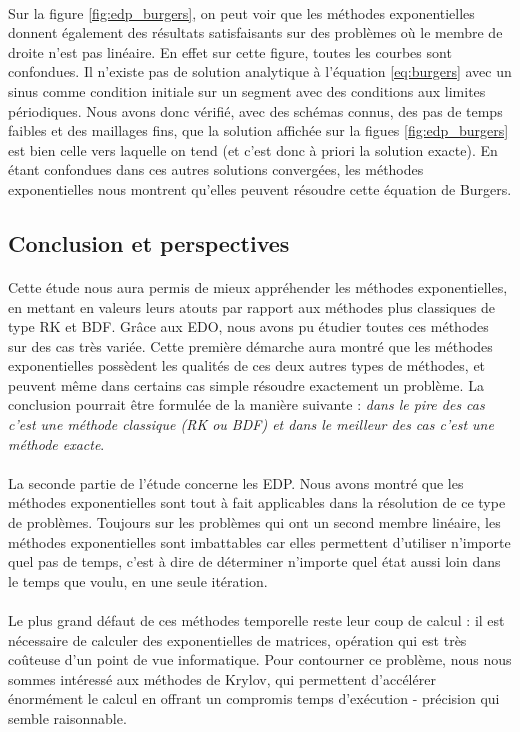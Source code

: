     \paragraph{}
    Sur la figure \ref{fig:edp_burgers}, on peut voir que les méthodes exponentielles donnent également des résultats satisfaisants sur des problèmes où le membre de droite n'est pas linéaire. En effet sur cette figure, toutes les courbes sont confondues. Il n'existe pas de solution analytique à l'équation \ref{eq:burgers} avec un sinus comme condition initiale sur un segment avec des conditions aux limites périodiques. Nous avons donc vérifié, avec des schémas connus, des pas de temps faibles et des maillages fins, que la solution affichée sur la figues \ref{fig:edp_burgers} est bien celle vers laquelle on tend (et c'est donc à priori la solution exacte). En étant confondues dans ces autres solutions convergées, les méthodes exponentielles nous montrent qu'elles peuvent résoudre cette équation de Burgers.
    

\subsection{Conclusion et perspectives}

\paragraph{}
Cette étude nous aura permis de mieux appréhender les méthodes exponentielles, en mettant en valeurs leurs atouts par rapport aux méthodes plus classiques de type RK et BDF. Grâce aux EDO, nous avons pu étudier toutes ces méthodes sur des cas très variée. Cette première démarche aura montré que les méthodes exponentielles possèdent les qualités de ces deux autres types de méthodes, et peuvent même dans certains cas simple résoudre exactement un problème. La conclusion pourrait être formulée de la manière suivante : \emph{dans le pire des cas c'est une méthode classique (RK ou BDF) et dans le meilleur des cas c'est une méthode exacte}.

\paragraph{}
La seconde partie de l'étude concerne les EDP. Nous avons montré que les méthodes exponentielles sont tout à fait applicables dans la résolution de ce type de problèmes. Toujours sur les problèmes qui ont un second membre linéaire, les méthodes exponentielles sont imbattables car elles permettent d'utiliser n'importe quel pas de temps, c'est à dire de déterminer n'importe quel état aussi loin dans le temps que voulu, en une seule itération.

\paragraph{} 
Le plus grand défaut de ces méthodes temporelle reste leur coup de calcul : il est nécessaire de calculer des exponentielles de matrices, opération qui est très coûteuse d'un point de vue informatique. Pour contourner ce problème, nous nous sommes intéressé aux méthodes de Krylov, qui permettent d'accélérer énormément le calcul en offrant un compromis temps d'exécution - précision qui semble raisonnable.
